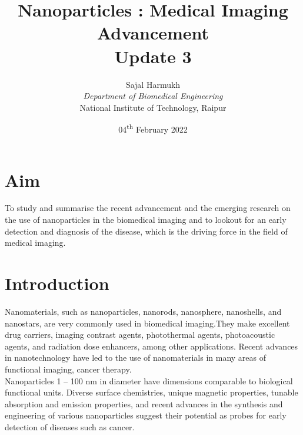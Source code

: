 \documentclass{article}
\title{\textbf{Nanoparticles : Medical Imaging Advancement\\Update 3}}
\author{Sajal Harmukh \\ \textit{Department of Biomedical Engineering} \\ National Institute of Technology, Raipur }
\date{04\textsuperscript{th} February 2022}
\begin{document}
\maketitle

\section*{Aim}
\large
To study and summarise the recent advancement and the emerging research on the use of nanoparticles in the biomedical imaging and to lookout for an early detection and diagnosis of the disease, which is the driving force in the field of medical imaging.

\section*{Introduction}
Nanomaterials, such as nanoparticles, nanorods, nanosphere, nanoshells, and nanostars, are
very commonly used in biomedical imaging.They make excellent drug carriers, imaging contrast agents, photothermal agents, photoacoustic agents, and radiation dose enhancers, among other applications. Recent advances in nanotechnology have led to the use of nanomaterials
in many areas of functional imaging, cancer therapy.\\ Nanoparticles 1 – 100 nm in diameter have dimensions comparable to biological functional units. Diverse surface chemistries, unique magnetic properties, tunable absorption and emission properties, and recent advances in the synthesis and engineering of various nanoparticles suggest their potential as probes for early detection of diseases such as cancer.
 
\end{document}
